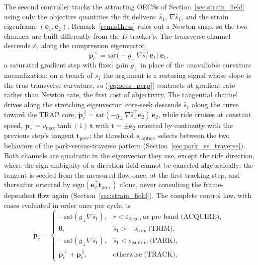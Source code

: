 \documentclass[lettersize,journal]{IEEEtran}
\begin{document}
The second controller tracks the attracting OECSs of
Section~\ref{sec:strain_field} using only the objective quantities the
fit delivers: $\hat{s}_1$, $\nabla\hat{s}_1$, and the strain eigenframe
$(\mathbf{e}_1, \mathbf{e}_2)$. Remark~\ref{rem:s1hess} rules out a
Newton snap, so the two channels are built differently from the $D$ tracker's.
The transverse channel descends $\hat{s}_1$ along the compression
eigenvector,
\begin{equation}
    \dot{\mathbf{p}}_c^{\,\perp} =
    \mathrm{sat}\!\bigl(-g_\perp\,\nabla\hat{s}_1^\top
    \mathbf{e}_1\bigr)\,\mathbf{e}_1,
    \label{eq:oecs_perp}
\end{equation}
a saturated gradient step with fixed gain $g_\perp$ in place of the
unavailable curvature normalization; on a trench of $s_1$ the argument
is a restoring signal whose slope is the true transverse curvature, so
(\ref{eq:oecs_perp}) contracts at gradient rate rather than Newton
rate, the first cost of objectivity. The tangential channel drives
along the stretching eigenvector: core-seek descends $\hat{s}_1$ along
the curve toward the TRAP core,
$\dot{\mathbf{p}}_c^{\,\parallel} =
\mathrm{sat}(-g_\perp\,\nabla\hat{s}_1^\top\mathbf{e}_2)\,
\mathbf{e}_2$, while ride cruises at constant speed,
$\dot{\mathbf{p}}_c^{\,\parallel} = v_{\max}\tanh(1)\,\mathbf{t}$
with $\mathbf{t} = \pm\mathbf{e}_2$ oriented by continuity with the
previous step's tangent $\mathbf{t}_{\text{prev}}$; the threshold
$s_{\text{capture}}$ selects between the two behaviors of the
park-versus-traverse pattern (Section~\ref{sec:park_vs_traverse}).
Both channels are quadratic in the eigenvector they use, except the
ride direction, where the sign ambiguity of a direction field cannot be
canceled algebraically: the tangent is seeded from the measured flow
once, at the first tracking step, and thereafter oriented by
$\mathrm{sign}(\mathbf{e}_2^\top \mathbf{t}_{\text{prev}})$ alone,
never consulting the frame-dependent flow again
(Section~\ref{sec:strain_field}). The complete control law, with cases
evaluated in order once per cycle, is
\begin{equation}
    \dot{\mathbf{p}}_c =
    \begin{cases}
        -\mathrm{sat}(g_\perp\nabla\hat{s}_1), &
            r < \varepsilon_{\text{degen}}\ \text{or pre-band
            (ACQUIRE)}, \\[1pt]
        \mathbf{0}, & \hat{s}_1 > -s_{\text{trim}} \ \text{(TRIM)},
            \\[1pt]
        -\mathrm{sat}(g_\perp\nabla\hat{s}_1), &
            \hat{s}_1 < s_{\text{capture}}\ \text{(PARK)}, \\[1pt]
        \dot{\mathbf{p}}_c^{\,\perp} +
            \dot{\mathbf{p}}_c^{\,\parallel}, &
            \text{otherwise (TRACK)},
    \end{cases}
    \label{eq:oecs_selector}
\end{equation}
\end{document}
